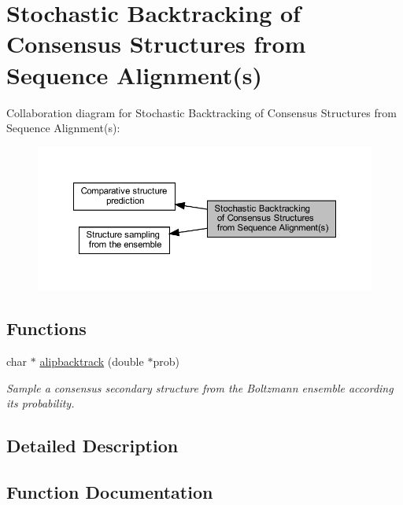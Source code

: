 \hypertarget{group__consensus__stochbt}{}\section{Stochastic Backtracking of Consensus Structures from Sequence Alignment(s)}
\label{group__consensus__stochbt}
Collaboration diagram for Stochastic Backtracking of Consensus Structures from Sequence Alignment(s)\+:
\nopagebreak
\begin{figure}[H]
\begin{center}
\leavevmode
\includegraphics[width=350pt]{group__consensus__stochbt}
\end{center}
\end{figure}
\subsection*{Functions}
\begin{DoxyCompactItemize}
\item 
char $\ast$ \hyperlink{group__consensus__stochbt_ga0df40248788f0fb17ebdc59d74116d1c}{alipbacktrack} (double $\ast$prob)
\begin{DoxyCompactList}\small\item\em Sample a consensus secondary structure from the Boltzmann ensemble according its probability. \end{DoxyCompactList}\end{DoxyCompactItemize}


\subsection{Detailed Description}


\subsection{Function Documentation}
\mbox{\label{group__consensus__stochbt_ga0df40248788f0fb17ebdc59d74116d1c}} 
